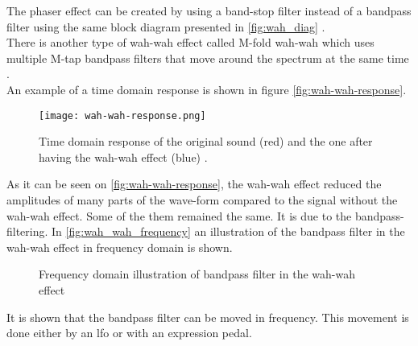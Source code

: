 The phaser effect can be created by using a band-stop filter instead of a bandpass filter using the same block diagram presented in \autoref{fig:wah_diag} \citep{wah-wah_cardiff}. \\

There is another type of wah-wah effect called M-fold wah-wah which uses multiple M-tap bandpass filters that move around the spectrum at the same time \citep{wah-wah_cardiff}. \\

An example of a time domain response is shown in figure \autoref{fig:wah-wah-response}. \\

\begin{figure} [htbp!]
	\centering
	\texttt{[image: wah-wah-response.png]}
	\caption{Time domain response of the original sound (red) and the one after having the wah-wah effect (blue) \citep{wah-wah_cardiff}.}
	\label{fig:wah-wah-response}
\end{figure}


As it can be seen on \autoref{fig:wah-wah-response}, the wah-wah effect reduced the amplitudes of many parts of the wave-form compared to the signal without the wah-wah effect. Some of the them remained the same. It is due to the bandpass-filtering.
In \autoref{fig:wah_wah_frequency} an illustration of the bandpass filter in the wah-wah effect in frequency domain is shown. 

\begin{figure}
\centering
\def\svgwidth{\columnwidth}

\caption{Frequency domain illustration of bandpass filter in the wah-wah effect}
		\label{fig:wah_wah_frequency}
\end{figure}

It is shown that the bandpass filter can be moved in frequency. This movement is done either by an \gls{lfo} or with an expression pedal.
